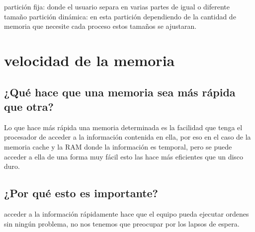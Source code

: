 \documentclass{article}
\begin{document}
partición fija: donde el usuario separa en varias partes de igual o diferente tamaño 
partición dinámica: en esta partición dependiendo de la cantidad de memoria que necesite cada proceso estos tamaños se ajustaran. 

\vspace{0.6cm}

\section{velocidad de la memoria}

\vspace{0.3cm}

\subsection{¿Qué hace que una memoria sea más rápida que otra?}

Lo que hace más rápida una memoria determinada es la facilidad que tenga el procesador de acceder a la información contenida en ella, por eso en el caso de la memoria cache y la RAM donde la información es temporal, pero se puede acceder a ella de una forma muy fácil esto las hace más eficientes que un disco duro.

\vspace{0.3cm}

\subsection{¿Por qué esto es importante?}

acceder a la información rápidamente hace que el equipo pueda ejecutar ordenes sin ningún problema, no nos tenemos que preocupar por los lapsos de espera.



\end{document}
